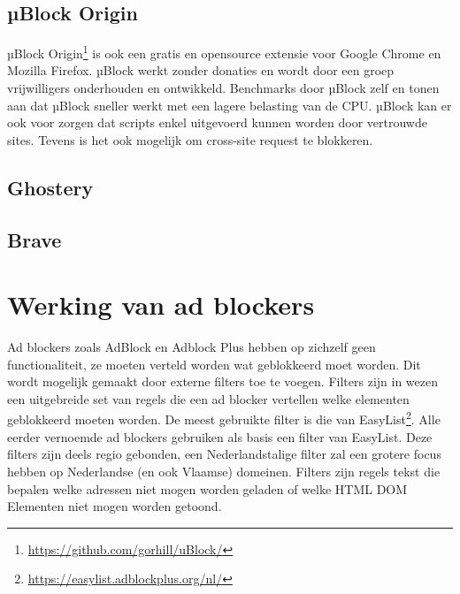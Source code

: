 \documentclass[pdftex,a4paper,12pt,twoside]{report}
\begin{document}
\subsection{µBlock Origin}
\label{sec:uBlock Origin}
µBlock Origin\footnote{\url{https://github.com/gorhill/uBlock/}} is ook een gratis en opensource extensie voor Google Chrome en Mozilla Firefox. µBlock werkt zonder donaties en wordt door een groep vrijwilligers onderhouden en ontwikkeld. Benchmarks door µBlock zelf en \citep{PerformanceAB} tonen aan dat µBlock sneller werkt met een lagere belasting van de CPU. µBlock kan er ook voor zorgen dat scripts enkel uitgevoerd kunnen worden door vertrouwde sites. Tevens is het ook mogelijk om cross-site request te blokkeren.

\subsection{Ghostery}
\label{sec:Ghostery}

\subsection{Brave}
\label{sec:Brave}


\section{Werking van ad blockers}
\label{ch:Werking van ad blockers}
Ad blockers zoals AdBlock en Adblock Plus hebben op zichzelf geen functionaliteit, ze moeten verteld worden wat geblokkeerd moet worden. Dit wordt mogelijk gemaakt door externe filters toe te voegen. Filters zijn in wezen een uitgebreide set van regels die een ad blocker vertellen welke elementen geblokkeerd moeten worden. De meest gebruikte filter is die van EasyList\footnote{\url{https://easylist.adblockplus.org/nl/}}. Alle eerder vernoemde ad blockers gebruiken als basis een filter van EasyList. Deze filters zijn deels regio gebonden, een Nederlandstalige filter zal een grotere focus hebben op Nederlandse (en ook Vlaamse) domeinen. Filters zijn regels tekst die bepalen welke adressen niet mogen worden geladen of welke HTML DOM Elementen niet mogen worden getoond.
\end{document}

